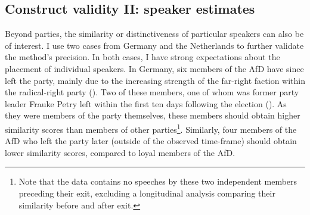 \documentclass{article}
\begin{document}



\subsection{Construct validity II: speaker estimates}

Beyond parties, the similarity or distinctiveness of particular speakers can also be of interest. I use two cases from Germany and the Netherlands to further validate the method's precision. In both cases, I have strong expectations about the placement of individual speakers. In Germany, six members of the AfD have since left the party, mainly due to the increasing strength of the far-right faction within the radical-right party (\cite{Steffen2020AfD}). Two of these members, one of whom was former party leader Frauke Petry left within the first ten days following the election (\cite{LSE2018AfD}). As they were members of the party themselves, these members should obtain higher similarity scores than members of other parties\footnote{Note that the data contains no speeches by these two independent members preceding their exit, excluding a longitudinal analysis comparing their similarity before and after exit.}. Similarly, four members of the AfD who left the party later (outside of the observed time-frame) should obtain lower similarity scores, compared to loyal members of the AfD. \par
\end{document}
